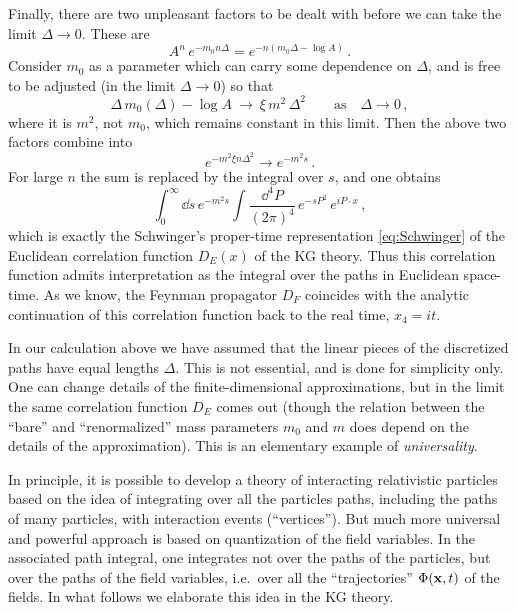 Finally, there are two unpleasant factors to be dealt with before we can take
the limit $\Delta\to0$. These are
\[
A^n\,e^{-m_0n\Delta}=e^{-n(m_0\Delta-\log A)}\,.
\]
Consider $m_0$ as a parameter which can carry some dependence on $\Delta$, and
is free to be adjusted (in the limit $\Delta\to0$) so that
\[
\Delta\,m_0(\Delta)-\log A\ \to\ \xi\,m^2\,\Delta^2\qquad\text{as}\quad\Delta\to0\,,
\]
where it is $m^2$, not $m_0$, which remains constant in this limit. Then the
above two factors combine into
\[
e^{-m^2\xi n\Delta^2}\to e^{-m^2s}\,.
\]
For large $n$ the sum is replaced by the integral over $s$, and one obtains
\[
\int_0^\infty \dd s\,e^{-m^2s}\int\frac{\dd^4P}{(2\pi)^4}\,e^{-sP^2}\,e^{iP\cdot x}\,,
\]
which is exactly the Schwinger's proper-time representation \eqref{eq:Schwinger}
of the Euclidean correlation function $D_E(x)$ of the KG theory. Thus this
correlation function admits interpretation as the integral over the paths in
Euclidean space-time. As we know, the Feynman propagator $D_F$ coincides with
the analytic continuation of this correlation function back to the real time,
$x_4=it$.

\begin{remark}
In our calculation above we have assumed that the linear pieces of the
discretized paths have equal lengths $\Delta$. This is not essential, and is
done for simplicity only. One can change details of the finite-dimensional
approximations, but in the limit the same correlation function $D_E$ comes
out (though the relation between the ``bare'' and ``renormalized'' mass
parameters $m_0$ and $m$ does depend on the details of the approximation).
This is an elementary example of \emph{universality}.
\end{remark}

In principle, it is possible to develop a theory of interacting relativistic
particles based on the idea of integrating over all the particles paths,
including the paths of many particles, with interaction events (``vertices'').
But much more universal and powerful approach is based on quantization of the
field variables. In the associated path integral, one integrates not over the
paths of the particles, but over the paths of the field variables, i.e.\ over
all the ``trajectories'' $\Phi(\mathbf{x},t)$ of the fields. In what follows we
elaborate this idea in the KG theory.

